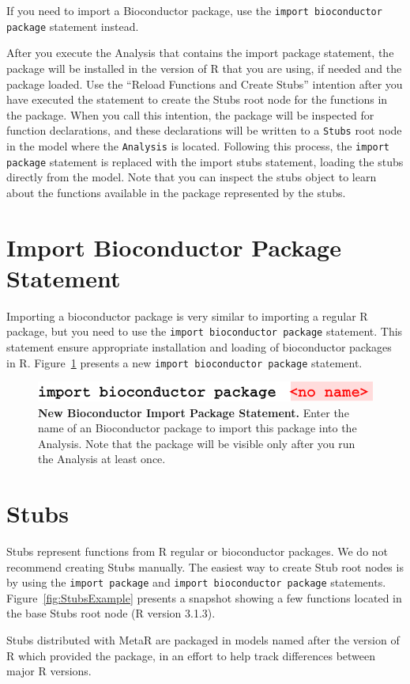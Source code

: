 \begin{remark}
If you need to import a Bioconductor package, use the \texttt{import bioconductor package} statement instead.
\end{remark}
After you execute the Analysis that contains the import package statement, the package will be installed in the version of R that you are using, if needed and the package loaded. 
Use the ``Reload Functions and Create Stubs'' intention after you have executed the statement to create the Stubs root node for the functions in the package. When you call this intention, the package will be inspected for function declarations, and these declarations will be written to a \texttt{Stubs} root node in the model where the \texttt{Analysis} is located. Following this process, the \texttt{import package} statement is replaced with the import stubs statement, loading the stubs directly from the model. Note that you can inspect the stubs object to learn about the functions available in the package represented by the stubs. 


\section{Import Bioconductor Package Statement}\label{sec:ImportBioconductorPackageStatement}
Importing a bioconductor package is very similar to importing a regular R package, but you need to use the \texttt{import bioconductor package} statement. This statement ensure appropriate installation and loading of bioconductor packages in R. Figure~\ref{fig:NewBioconductorImportPackage} presents a new \texttt{import bioconductor package} statement.

\begin{figure}[h!tbp]
  \centering
  \includegraphics[width=\figWidthNarrow]{figures/NewImportBioconductorPackage.pdf}
\caption[New Import Bioconductor Package Statement.]{\textbf{New Bioconductor Import Package Statement.}  Enter the name of an Bioconductor package to import this package into the Analysis. Note that the package will be visible only after you run the Analysis at least once.}
\label{fig:NewBioconductorImportPackage}
\end{figure}

\section{Stubs}
Stubs represent functions from R regular or bioconductor packages. We do not recommend creating Stubs manually. The easiest way to create Stub root nodes is by using the \texttt{import package} and \texttt{import bioconductor package} statements. Figure~\ref{fig:StubsExample} presents a snapshot showing a few functions located in the base Stubs root node (R version 3.1.3).
\begin{remark}
Stubs distributed with MetaR are packaged in models named after the version of R which provided the package, in an effort to help track differences between major R versions.
\end{remark}


